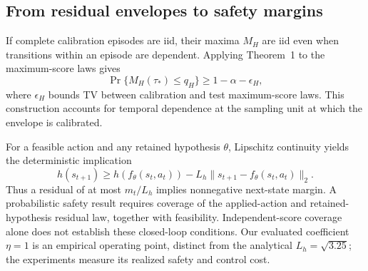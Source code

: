 \subsection{From residual envelopes to safety margins}
If complete calibration episodes are iid, their maxima $M_H$ are iid even
when transitions within an episode are dependent. Applying Theorem~1 to
the maximum-score laws gives
\begin{equation}
 \Pr\{M_H(\tau_*)\leq q_H\}\geq1-\alpha-\epsilon_H,
 \label{eq:trajectory}
\end{equation}
where $\epsilon_H$ bounds TV between calibration and test maximum-score
laws. This construction accounts for temporal dependence at the sampling
unit at which the envelope is calibrated.

For a feasible action and any retained hypothesis $\theta$, Lipschitz
continuity yields the deterministic implication
\begin{equation}
 h(s_{t+1})\geq h(f_\theta(s_t,a_t))
       -L_h\|s_{t+1}-f_\theta(s_t,a_t)\|_2.
 \label{eq:lipschitz}
\end{equation}
Thus a residual of at most $m_t/L_h$ implies nonnegative next-state margin.
A probabilistic safety result requires coverage of the applied-action and
retained-hypothesis residual law, together with feasibility. Independent-score
coverage alone does not establish these closed-loop conditions.
Our evaluated coefficient $\eta=1$ is an empirical operating point,
distinct from the analytical $L_h=\sqrt{3.25}$; the experiments measure its
realized safety and control cost.
